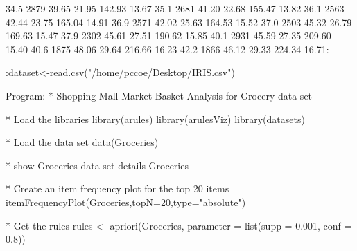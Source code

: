 \documentclass[10pt,a4paper]{article}
\begin{document}
{{   34.5 2879   39.65   21.95 142.93    13.67
   35.1 2681   41.20   22.68 155.47    13.82
   36.1 2563   42.44   23.75 165.04    14.91
   36.9 2571   42.02   25.63 164.53    15.52
   37.0 2503   45.32   26.79 169.63    15.47
   37.9 2302   45.61   27.51 190.62    15.85
   40.1 2931   45.59   27.35 209.60    15.40
   40.6 1875   48.06   29.64 216.66    16.23
   42.2 1866   46.12   29.33 224.34    16.71: 
\newline

:dataset<-read.csv("/home/pccoe/Desktop/IRIS.csv")
\newline




Program:
\newline
* Shopping Mall Market Basket Analysis for Grocery data set 
\newline

* Load the libraries
\newline
library(arules)
\newline
library(arulesViz)
\newline
library(datasets)
\newline

* Load the data set
\newline
data(Groceries)
\newline

* show Groceries data set details
\newline
Groceries
\newline

* Create an item frequency plot for the top 20 items
\newline
itemFrequencyPlot(Groceries,topN=20,type="absolute")
\newline

* Get the rules
\newline
rules <- apriori(Groceries, parameter = list(supp = 0.001, conf = 0.8))
\newline

}}
\end{document}
